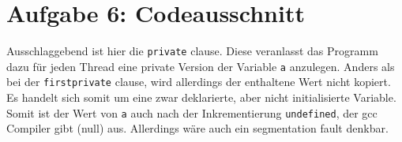 \chapter{Aufgabe 6: Codeausschnitt}
Ausschlaggebend ist hier die \texttt{private} clause. Diese veranlasst das Programm dazu für jeden Thread eine private Version der Variable \texttt{a} anzulegen. Anders als bei der \texttt{firstprivate} clause, wird allerdings der enthaltene Wert nicht kopiert. Es handelt sich somit um eine zwar deklarierte, aber nicht initialisierte Variable. Somit ist der Wert von \texttt{a} auch nach der Inkrementierung \texttt{undefined}, der gcc Compiler gibt (null) aus. Allerdings wäre auch ein segmentation fault denkbar.   
